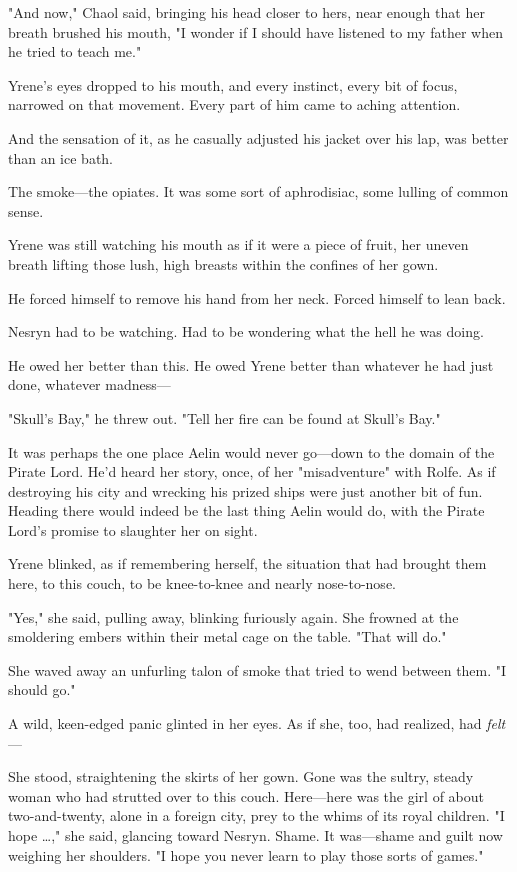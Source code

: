 "And now," Chaol said, bringing his head closer to hers, near enough that her breath brushed his mouth, "I wonder if I should have listened to my father when he tried to teach me."

Yrene's eyes dropped to his mouth, and every instinct, every bit of focus, narrowed on that movement. Every part of him came to aching attention.

And the sensation of it, as he casually adjusted his jacket over his lap, was better than an ice bath.

The smoke---the opiates. It was some sort of aphrodisiac, some lulling of common sense.

Yrene was still watching his mouth as if it were a piece of fruit, her uneven breath lifting those lush, high breasts within the confines of her gown.

He forced himself to remove his hand from her neck. Forced himself to lean back.

Nesryn had to be watching. Had to be wondering what the hell he was doing.

He owed her better than this. He owed Yrene better than whatever he had just done, whatever madness---

"Skull's Bay," he threw out. "Tell her fire can be found at Skull's Bay."

It was perhaps the one place Aelin would never go---down to the domain of the Pirate Lord. He'd heard her story, once, of her "misadventure" with Rolfe. As if destroying his city and wrecking his prized ships were just another bit of fun. Heading there would indeed be the last thing Aelin would do, with the Pirate Lord's promise to slaughter her on sight.

Yrene blinked, as if remembering herself, the situation that had brought them here, to this couch, to be knee-to-knee and nearly nose-to-nose.

"Yes," she said, pulling away, blinking furiously again. She frowned at the smoldering embers within their metal cage on the table. "That will do."

She waved away an unfurling talon of smoke that tried to wend between them. "I should go."

A wild, keen-edged panic glinted in her eyes. As if she, too, had realized, had \emph{felt}---

She stood, straightening the skirts of her gown. Gone was the sultry, steady woman who had strutted over to this couch. Here---here was the girl of about two-and-twenty, alone in a foreign city, prey to the whims of its royal children. "I hope \ldots," she said, glancing toward Nesryn. Shame. It was---shame and guilt now weighing her shoulders. "I hope you never learn to play those sorts of games."

